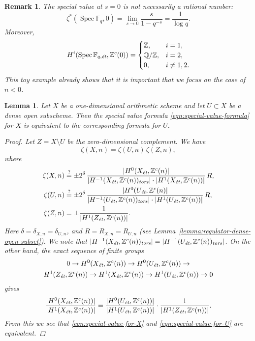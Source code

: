 \documentclass{article}
\DeclareMathOperator{\Spec}{Spec}
\newcommand{\FF}{\mathbb{F}}
\newcommand{\QQ}{\mathbb{Q}}
\newcommand{\ZZ}{\mathbb{Z}}
\newcommand{\et}{\text{\it \'{e}t}}
\newcommand{\tors}{\text{\it tors}}
\theoremstyle{myplain}
\newtheorem{lemma}[theorem]{Lemma}
\theoremstyle{mydefinition}
\newtheorem{remark}[theorem]{Remark}
\begin{document}
\begin{remark}
  The special value at $s = 0$ is not necessarily a rational number:
  \[ \zeta^* (\Spec \FF_q, 0) =
    \lim_{s \to 0} \frac{s}{1 - q^{-s}} =
    \frac{1}{\log q}. \]
  Moreover,
  \[ H^i (\Spec \FF_{q,\et}, \ZZ^c (0)) =
    \begin{cases}
      \ZZ, & i = 1, \\
      \QQ/\ZZ, & i = 2, \\
      0, & i \ne 1,2.
    \end{cases} \]
  This toy example already shows that it is important that we focus on the case
  of $n < 0$.
\end{remark}

\begin{lemma}
  \label{lemma:elementary-proof-2}
  Let $X$ be a one-dimensional arithmetic scheme and let $U \subset X$ be a
  dense open subscheme. Then the special value formula
  \eqref{eqn:special-value-formula} for $X$ is equivalent to the corresponding
  formula for $U$.

  \begin{proof}
    Let $Z = X\setminus U$ be the zero-dimensional complement. We have
    $$\zeta (X,n) = \zeta (U,n)\,\zeta (Z,n),$$
    where
    \begin{align}
      \label{eqn:special-value-for-X} \zeta (X,n) & \stackrel{?}{=} \pm 2^\delta\,\frac{|H^0 (X_\et, \ZZ^c (n)|}{|H^{-1} (X_\et, \ZZ^c (n))_\tors| \cdot |H^1 (X_\et, \ZZ^c (n))|}\,R, \\
      \label{eqn:special-value-for-U} \zeta (U,n) & \stackrel{?}{=} \pm 2^\delta\,\frac{|H^0 (U_\et, \ZZ^c (n)|}{|H^{-1} (U_\et, \ZZ^c (n))_\tors| \cdot |H^1 (U_\et, \ZZ^c (n))|}\,R, \\
      \notag \zeta (Z,n) & = \pm\frac{1}{|H^1 (Z_\et, \ZZ^c (n))|}.
    \end{align}
    Here $\delta = \delta_{X,n} = \delta_{U,n}$, and $R = R_{X,n} = R_{U,n}$
    (see Lemma~\ref{lemma:regulator-dense-open-subset}). We note that
    $|H^{-1} (X_\et, \ZZ^c (n))_\tors| = |H^{-1} (U_\et, \ZZ^c (n))_\tors|$.
    On the other hand, the exact sequence of finite groups
    \begin{multline}
      0 \to H^0 (X_\et, \ZZ^c (n)) \to
      H^0 (U_\et, \ZZ^c (n)) \to \\
      H^1 (Z_\et, \ZZ^c (n)) \to
      H^1 (X_\et, \ZZ^c (n)) \to
      H^1 (U_\et, \ZZ^c (n)) \to 0
    \end{multline}
    gives
    \[ \frac{|H^0 (X_\et, \ZZ^c (n))|}{|H^1 (X_\et, \ZZ^c (n))|} =
      \frac{|H^0 (U_\et, \ZZ^c (n))|}{|H^1 (U_\et, \ZZ^c (n))|}\cdot
      \frac{1}{|H^1 (Z_\et, \ZZ^c (n))|}. \]
    From this we see that \eqref{eqn:special-value-for-X} and
    \eqref{eqn:special-value-for-U} are equivalent.
  \end{proof}
\end{lemma}
\end{document}
